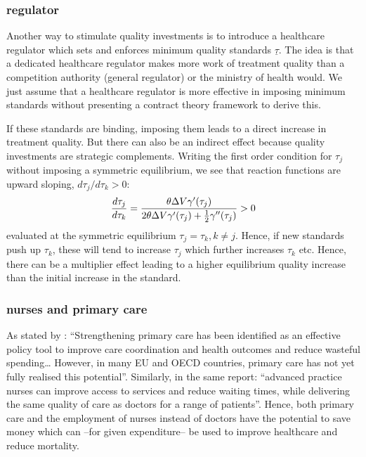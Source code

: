 \documentclass[a4paper,12pt]{article}
\begin{document}
\subsubsection{regulator}
\label{sec:org3edfc11}

Another way to stimulate quality investments is to introduce a healthcare regulator which sets and enforces minimum quality standards \(\underline \tau\). The idea is that a dedicated healthcare regulator makes more work of treatment quality than a competition authority (general regulator) or the ministry of health would. We just assume that a healthcare regulator is more effective in imposing minimum standards without presenting a contract theory framework to derive this.

If these standards are binding, imposing them leads to a direct increase in treatment quality. But there can also be an indirect effect because quality investments are strategic complements. Writing the first order condition for \(\tau_j\) without imposing a symmetric equilibrium, we see that reaction functions are upward sloping, \(d \tau_j/d \tau_k > 0\):
\begin{equation}
\label{eq:28}
\frac{d\tau_j}{d\tau_k} = \frac{\theta \Delta V \gamma'(\tau_j)}{2\theta\Delta V \gamma'(\tau_j) + \textstyle{1\over 2} \gamma''(\tau_j)} > 0
\end{equation}
evaluated at the symmetric equilibrium \(\tau_j=\tau_k, k \neq j\). Hence, if new standards push up \(\tau_k\), these will tend to increase \(\tau_j\) which further increases \(\tau_k\) etc. Hence, there can be a multiplier effect leading to a higher equilibrium quality increase than the initial increase in the standard.

\subsubsection{nurses and primary care}
\label{sec:org35eea6f}

As stated by \cite{OECD_2020}: ``Strengthening primary care has been identified as an effective policy tool to improve care coordination and health outcomes and reduce wasteful spending\ldots{} However, in many EU and OECD countries, primary care has not yet fully realised this potential''. Similarly, in the same report: ``advanced practice nurses can improve access to services and reduce waiting times, while delivering the same quality of care as doctors for a range of patients''. Hence, both primary care and the employment of nurses instead of doctors have the potential to save money which can --for given expenditure-- be used to improve healthcare and reduce mortality.
\end{document}
